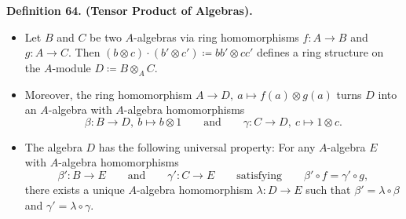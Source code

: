 \documentclass[12pt,a4paper,footinclude=true,headinclude=true]{scrbook} %
\newenvironment{definition}[2][Definition]
    { \begin{mdframed}[backgroundcolor=gray!20] \textbf{#1 #2.}\ }
    {  \end{mdframed}}
\begin{document}
\begin{definition}{64. (Tensor Product of Algebras)}
    \begin{itemize}
        \item Let $B$ and $C$ be two $A$-algebras via ring homomorphisms $f:A\to B$ and $g:A\to C$. Then $(b\otimes c)\cdot(b'\otimes c')\coloneqq bb'\otimes cc'$ defines a ring structure on the $A$-module $D\coloneqq B\otimes_AC$.
        \item Moreover, the ring homomorphism $A\to D,\ a\mapsto f(a)\otimes g(a)$ turns $D$ into an $A$-algebra with $A$-algebra homomorphisms
        \begin{equation*}
            \beta:B\to D,\ b\mapsto b\otimes1\qquad\text{and}\qquad \gamma:C\to D,\ c\mapsto1\otimes c.
        \end{equation*}
        \item The algebra $D$ has the following universal property: For any $A$-algebra $E$ with $A$-algebra homomorphisms 
        \begin{equation*}
            \beta':B\to E\qquad\text{and}\qquad \gamma':C\to E\qquad \text{satisfying}\qquad \beta'\circ f=\gamma'\circ g,
        \end{equation*}
        there exists a unique $A$-algebra homomorphism $\lambda:D\to E$ such that $\beta'=\lambda\circ\beta$ and $\gamma'=\lambda\circ \gamma$.
    \end{itemize}
    \begin{center}
    \end{center}
\end{definition}
\newpage
\end{document}
